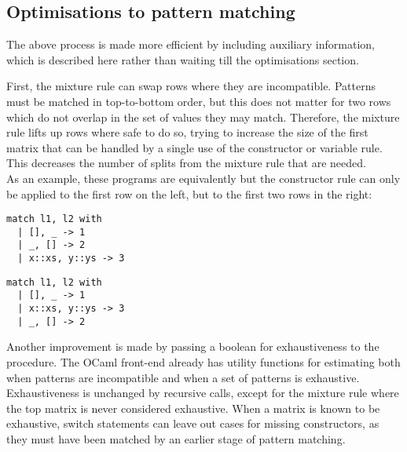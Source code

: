 

\subsection{Optimisations to pattern matching}
The above process is made more efficient by including auxiliary information, which is described here rather than waiting till the optimisations section.


First, the mixture rule can swap rows where they are incompatible. Patterns must be matched in top-to-bottom order, but this does not matter for two rows which do not overlap in the set of values they may match. Therefore, the mixture rule lifts up rows where safe to do so, trying to increase the size of the first matrix that can be handled by a single use of the constructor or variable rule. This decreases the number of splits from the mixture rule that are needed. \\
As an example, these programs are equivalently but the constructor rule can only be applied to the first row on the left, but to the first two rows in the right:

\begin{minipage}{0.45\textwidth}
\begin{verbatim}
match l1, l2 with
  | [], _ -> 1
  | _, [] -> 2
  | x::xs, y::ys -> 3
\end{verbatim}
\end{minipage}\qquad
\begin{minipage}{0.45\textwidth}
\begin{verbatim}
match l1, l2 with
  | [], _ -> 1
  | x::xs, y::ys -> 3
  | _, [] -> 2
\end{verbatim}
\end{minipage}

Another improvement is made by passing a boolean for exhaustiveness to the procedure. The OCaml front-end already has utility functions for estimating both when patterns are incompatible and when a set of patterns is exhaustive. Exhaustiveness is unchanged by recursive calls, except for the mixture rule where the top matrix is never considered exhaustive. When a matrix is known to be exhaustive, switch statements can leave out cases for missing constructors, as they must have been matched by an earlier stage of pattern matching. 



